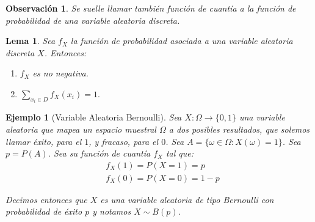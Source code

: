\documentclass{report}
\newtheorem{lem}{Lema}[section]
\newtheorem{obs}{Observación}[section]
\newtheorem{ej}{Ejemplo}[section]
\begin{document}
\begin{obs}
    Se suelle llamar también \emph{función de cuantía} a la función de probabilidad de una variable aleatoria discreta.
\end{obs}

\begin{lem}
    Sea $f_X$ la función de probabilidad asociada a una variable aleatoria discreta $X$. Entonces:
    \begin{enumerate}
        \item $f_X$ es no negativa.
        \item $\displaystyle\sum_{x_i\in D} f_X(x_i) = 1.$
    \end{enumerate}
\end{lem}


\begin{ej}[Variable Aleatoria Bernoulli]
    Sea $X:\Omega \rightarrow \{0,1\}$ una variable aleatoria que mapea un espacio muestral $\Omega$ a dos posibles resultados, que solemos llamar
    \emph{éxito}, para el $1$, y \emph{fracaso}, para el $0$. Sea $A=\{\omega \in\Omega: X(\omega)=1\}$. Sea $p=P(A)$. Sea su función de cuantía $f_X$ tal que:
    \begin{equation*}
        \begin{split}
            &f_X(1) = P(X=1) = p\\
            &f_X(0) = P(X=0) = 1-p
        \end{split}
    \end{equation*}

    Decimos entonces que $X$ es una variable aleatoria de tipo Bernoulli con probabilidad de éxito $p$ y notamos $X\sim B(p)$.
\end{ej}
\end{document}
